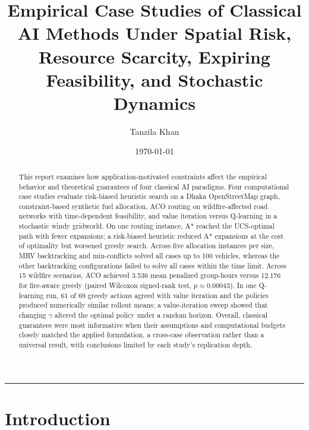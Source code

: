 \documentclass{ai-lab-report}
\title{Empirical Case Studies of Classical AI Methods Under Spatial Risk, Resource Scarcity, Expiring Feasibility, and Stochastic Dynamics}
\author{Tanzila Khan}
\date{\today}
\begin{document}
\maketitle

\begin{abstract}
This report examines how application-motivated constraints affect the empirical behavior and theoretical guarantees of four classical AI paradigms. Four computational case studies evaluate risk-biased heuristic search on a Dhaka OpenStreetMap graph, constraint-based synthetic fuel allocation, ACO routing on wildfire-affected road networks with time-dependent feasibility, and value iteration versus Q-learning in a stochastic windy gridworld. On one routing instance, A* reached the UCS-optimal path with fewer expansions; a risk-biased heuristic reduced A* expansions at the cost of optimality but worsened greedy search. Across five allocation instances per size, MRV backtracking and min-conflicts solved all cases up to 100 vehicles, whereas the other backtracking configurations failed to solve all cases within the time limit. Across 15 wildfire scenarios, ACO achieved 3.536 mean penalized group-hours versus 12.176 for fire-aware greedy (paired Wilcoxon signed-rank test, $p\approx0.00043$). In one Q-learning run, 61 of 69 greedy actions agreed with value iteration and the policies produced numerically similar rollout means; a value-iteration sweep showed that changing $\gamma$ altered the optimal policy under a random horizon. Overall, classical guarantees were most informative when their assumptions and computational budgets closely matched the applied formulation, a cross-case observation rather than a universal result, with conclusions limited by each study's replication depth.
\end{abstract}

\par\vspace{5mm}
\noindent\rule{\textwidth}{0.4pt}
\section{Introduction}
\end{document}
